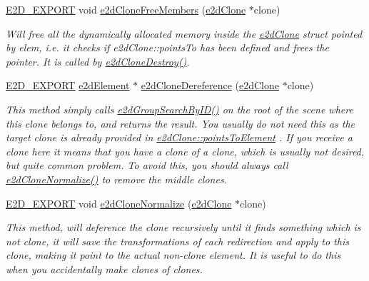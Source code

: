 \begin{DoxyCompactItemize}
\hyperlink{Ez2DS_8h_a9f14e9cb869e1a85fdaba03afcca0df9}{E2\-D\-\_\-\-E\-X\-P\-O\-R\-T} void \hyperlink{group__e2dClone_gae3437977dc551bb014cefcfad690009a}{e2d\-Clone\-Free\-Members} (\hyperlink{structe2dClone}{e2d\-Clone} $\ast$clone)
\begin{DoxyCompactList}\small\item\em Will free all the dynamically allocated memory inside the \hyperlink{structe2dClone}{e2d\-Clone} struct pointed by elem, i.\-e. it checks if e2d\-Clone\-::points\-To has been defined and frees the pointer. It is called by \hyperlink{group__e2dClone_ga7681ea62c6809fe1daf1c4ac6e873df5}{e2d\-Clone\-Destroy()}. \end{DoxyCompactList}\item 
\hyperlink{Ez2DS_8h_a9f14e9cb869e1a85fdaba03afcca0df9}{E2\-D\-\_\-\-E\-X\-P\-O\-R\-T} \hyperlink{structe2dElement}{e2d\-Element} $\ast$ \hyperlink{group__e2dClone_ga7a2d3abbe249ab9c4a402d31ef0b9275}{e2d\-Clone\-Dereference} (\hyperlink{structe2dClone}{e2d\-Clone} $\ast$clone)
\begin{DoxyCompactList}\small\item\em This method simply calls \hyperlink{group__e2dGroup_ga0c495948b5e2e14d004d1daacf4811af}{e2d\-Group\-Search\-By\-I\-D()} on the root of the scene where this clone belongs to, and returns the result. You usually do not need this as the target clone is already provided in \hyperlink{structe2dClone_a237249b3b105a04b15b87304bba704a2}{e2d\-Clone\-::points\-To\-Element} . If you receive a clone here it means that you have a clone of a clone, which is usually not desired, but quite common problem. To avoid this, you should always call \hyperlink{group__e2dClone_ga06841abcefcbb9de290b3421ace940cc}{e2d\-Clone\-Normalize()} to remove the middle clones. \end{DoxyCompactList}\item 
\hyperlink{Ez2DS_8h_a9f14e9cb869e1a85fdaba03afcca0df9}{E2\-D\-\_\-\-E\-X\-P\-O\-R\-T} void \hyperlink{group__e2dClone_ga06841abcefcbb9de290b3421ace940cc}{e2d\-Clone\-Normalize} (\hyperlink{structe2dClone}{e2d\-Clone} $\ast$clone)
\begin{DoxyCompactList}\small\item\em This method, will deference the clone recursively until it finds something which is not clone, it will save the transformations of each redirection and apply to this clone, making it point to the actual non-\/clone element. It is useful to do this when you accidentally make clones of clones. \end{DoxyCompactList}\item 

\end{DoxyCompactItemize}
